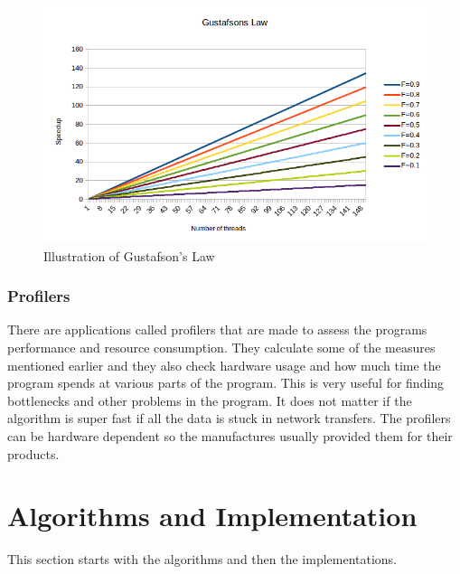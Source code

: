 \documentclass[10pt,a4paper]{report}
\begin{document}
\begin{figure}[h]
    \centering
    \includegraphics[width=13cm]{GustafsonsLaw.png}
    \caption{Illustration of Gustafson's Law}
    \label{fig:GustafsonsLaw}
\end{figure}

\subsection{Profilers}
There are applications called profilers that are made to assess the programs performance and resource consumption. They calculate some of the measures mentioned earlier and they also check hardware usage and how much time the program spends at various parts of the program. This is very useful for finding bottlenecks and other problems in the program. It does not matter if the algorithm is super fast if all the data is stuck in network transfers. The profilers can be hardware dependent so the manufactures usually provided them for their products.\cite{introduction_hpc_hager, cuda_best_practice}




\clearpage
\chapter{Algorithms and Implementation}

This section starts with the algorithms and then the implementations.
\end{document}
